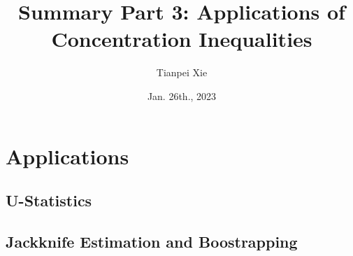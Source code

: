 \documentclass[11pt]{article}
\begin{document}
\title{Summary Part 3: Applications of Concentration Inequalities}
\author{ Tianpei Xie}
\date{Jan. 26th., 2023 }
\maketitle
\tableofcontents
\newpage
\section{Applications}
\subsection{U-Statistics}
\subsection{Jackknife Estimation and Boostrapping}
\end{document}
